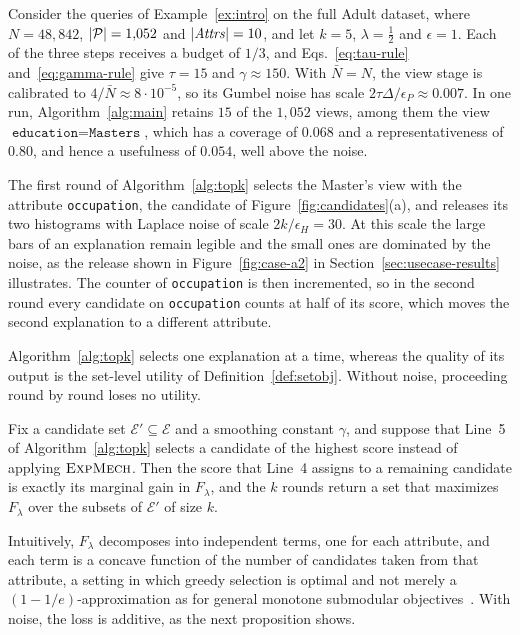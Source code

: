 \begin{example}
\label{ex:trace}
Consider the queries of Example~\ref{ex:intro} on the full Adult dataset, where $N=48{,}842$, $|\mathcal{P}|=1{,}052$ and $|\mathit{Attrs}|=10$, and let $k=5$, $\lambda=\tfrac12$ and $\epsilon=1$.
Each of the three steps receives a budget of $1/3$, and Eqs.~\eqref{eq:tau-rule} and~\eqref{eq:gamma-rule} give $\tau=15$ and $\gamma\approx150$.
With $\bar N=N$, the view stage is calibrated to $4/\bar N\approx8\cdot10^{-5}$, so its Gumbel noise has scale $2\tau\Delta/\epsilon_P\approx0.007$.
In one run, Algorithm~\ref{alg:main} retains $15$ of the $1{,}052$ views, among them the view $\texttt{education}=\texttt{Masters}$, which has a coverage of $0.068$ and a representativeness of $0.80$, and hence a usefulness of $0.054$, well above the noise.

The first round of Algorithm~\ref{alg:topk} selects the Master's view with the attribute \texttt{occupation}, the candidate of Figure~\ref{fig:candidates}(a), and releases its two histograms with Laplace noise of scale $2k/\epsilon_H=30$.
At this scale the large bars of an explanation remain legible and the small ones are dominated by the noise, as the release shown in Figure~\ref{fig:case-a2} in Section~\ref{sec:usecase-results} illustrates.
The counter of \texttt{occupation} is then incremented, so in the second round every candidate on \texttt{occupation} counts at half of its score, which moves the second explanation to a different attribute.
\end{example}

Algorithm~\ref{alg:topk} selects one explanation at a time, whereas the quality of its output is the set-level utility of Definition~\ref{def:setobj}.
Without noise, proceeding round by round loses no utility.

\begin{proposition}
\label{prop:greedy-exact}
Fix a candidate set $\mathcal{E}'\subseteq\mathcal{E}$ and a smoothing constant $\gamma$, and suppose that Line~5 of Algorithm~\ref{alg:topk} selects a candidate of the highest score instead of applying $\textsc{ExpMech}$.
Then the score that Line~4 assigns to a remaining candidate is exactly its marginal gain in $F_\lambda$, and the $k$ rounds return a set that maximizes $F_\lambda$ over the subsets of $\mathcal{E}'$ of size $k$.
\end{proposition}

Intuitively, $F_\lambda$ decomposes into independent terms, one for each attribute, and each term is a concave function of the number of candidates taken from that attribute, a setting in which greedy selection is optimal and not merely a $(1-1/e)$-approximation as for general monotone submodular objectives~\cite{NemhauserWF78,Feige98}.
With noise, the loss is additive, as the next proposition shows.

